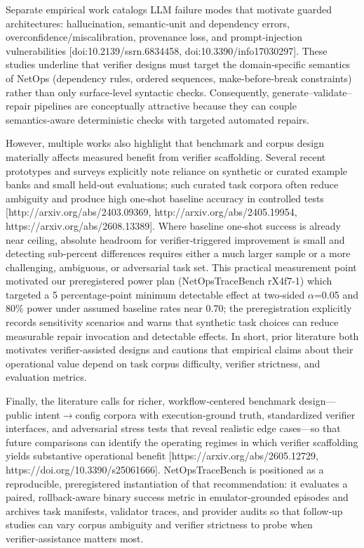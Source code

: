 \documentclass[conference]{IEEEtran}
\begin{document}
Separate empirical work catalogs LLM failure modes that motivate guarded architectures: hallucination, semantic‑unit and dependency errors, overconfidence/miscalibration, provenance loss, and prompt‑injection vulnerabilities [doi:10.2139/ssrn.6834458, doi:10.3390/info17030297]. These studies underline that verifier designs must target the domain‑specific semantics of NetOps (dependency rules, ordered sequences, make‑before‑break constraints) rather than only surface‑level syntactic checks. Consequently, generate--validate--repair pipelines are conceptually attractive because they can couple semantics‑aware deterministic checks with targeted automated repairs.

However, multiple works also highlight that benchmark and corpus design materially affects measured benefit from verifier scaffolding. Several recent prototypes and surveys explicitly note reliance on synthetic or curated example banks and small held‑out evaluations; such curated task corpora often reduce ambiguity and produce high one‑shot baseline accuracy in controlled tests [http://arxiv.org/abs/2403.09369, http://arxiv.org/abs/2405.19954, https://arxiv.org/abs/2608.13389]. Where baseline one‑shot success is already near ceiling, absolute headroom for verifier‑triggered improvement is small and detecting sub‑percent differences requires either a much larger sample or a more challenging, ambiguous, or adversarial task set. This practical measurement point motivated our preregistered power plan (NetOpsTraceBench rX4f7-1) which targeted a 5 percentage‑point minimum detectable effect at two‑sided \ensuremath{\alpha}=0.05 and 80\% power under assumed baseline rates near 0.70; the preregistration explicitly records sensitivity scenarios and warns that synthetic task choices can reduce measurable repair invocation and detectable effects. In short, prior literature both motivates verifier‑assisted designs and cautions that empirical claims about their operational value depend on task corpus difficulty, verifier strictness, and evaluation metrics.

Finally, the literature calls for richer, workflow‑centered benchmark design---public intent\ensuremath{\rightarrow}config corpora with execution‑ground truth, standardized verifier interfaces, and adversarial stress tests that reveal realistic edge cases---so that future comparisons can identify the operating regimes in which verifier scaffolding yields substantive operational benefit [https://arxiv.org/abs/2605.12729, https://doi.org/10.3390/s25061666]. NetOpsTraceBench is positioned as a reproducible, preregistered instantiation of that recommendation: it evaluates a paired, rollback‑aware binary success metric in emulator‑grounded episodes and archives task manifests, validator traces, and provider audits so that follow‑up studies can vary corpus ambiguity and verifier strictness to probe when verifier‑assistance matters most.
\end{document}
